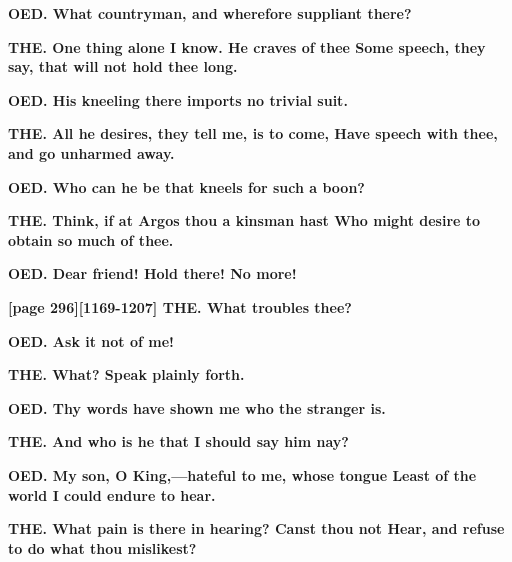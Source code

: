 \documentclass[11pt,letter]{book}
\begin{document}
\par \textbf{OED. What countryman, and wherefore suppliant there?}
\par 

\par \textbf{THE. One thing alone I know. He craves of thee Some speech, they say, that will not hold thee long.}
\par 

\par \textbf{OED. His kneeling there imports no trivial suit.}
\par 

\par \textbf{THE. All he desires, they tell me, is to come, Have speech with thee, and go unharmed away.}
\par 

\par \textbf{OED. Who can he be that kneels for such a boon?}
\par 

\par \textbf{THE. Think, if at Argos thou a kinsman hast Who might desire to obtain so much of thee.}
\par 

\par \textbf{OED. Dear friend! Hold there! No more!}
\par 

\par \textbf{[page 296][1169-1207] THE. What troubles thee?}
\par 

\par \textbf{OED. Ask it not of me!}
\par 

\par \textbf{THE. What? Speak plainly forth.}
\par 

\par \textbf{OED. Thy words have shown me who the stranger is.}
\par 

\par \textbf{THE. And who is he that I should say him nay?}
\par 

\par \textbf{OED. My son, O King,—hateful to me, whose tongue Least of the world I could endure to hear.}
\par 

\par \textbf{THE. What pain is there in hearing? Canst thou not Hear, and refuse to do what thou mislikest?}
\par 
\end{document}
